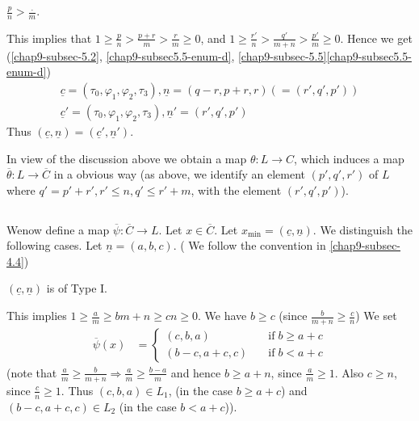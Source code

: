 \begin{case}\label{chap9-5.7-case-2}
$\frac{p}{n} > \frac{.}{m}$.

This implies that $1 \geq \frac{p}{n} > \frac{p+r}{m} > \frac{r}{m} \geq 0$, and $1 \geq \frac{r'}{n} > \frac{q'}{m+n} > \frac{p'}{m} \geq 0$. Hence we get (\ref{chap9-subsec-5.2}, \eqref{chap9-subsec5.5-enum-d}, \ref{chap9-subsec-5.5}\eqref{chap9-subsec5.5-enum-d})
\begin{gather*}
\underline{c} = (\tau_{0}, \varphi_{1}, \varphi_{2}, \tau_{3}), \underline{n} = (q-r, p+r,r)(=(r',q',p'))\\
\underline{c}' = (\tau_{0}, \varphi_{1}, \varphi_{2}, \tau_{3}), \underline{n}'= (r', q',p')
\end{gather*}
Thus $(\underline{c}, \underline{n}) = (\underline{c}', \underline{n}')$.
\end{case}

In view of the discussion above we obtain a map $\theta: L \longrightarrow C$, which induces a map $\overline{\theta} : L \longrightarrow \overline{C}$ in a obvious way (as above, we identify an element $(p',q',r')$ of $L$ where $q'=p'+r', r'\leq n, q'\leq r'+m$, with the element $(r', q', p')$).

\setcounter{subsection}{7}
\subsection{}\label{chap9-subsec-5.8}
We\pageoriginale  now define a map $\overline{\psi} : \overline{C} \longrightarrow L$. Let $x \in \overline{C}$. Let $x_{\min} = (\underline{c}, \underline{n})$. We distinguish the following cases. Let $\underline{n}= (a, b, c)$. ( We follow the convention
in \ref{chap9-subsec-4.4})

\setcounter{case}{0}
\begin{case}\label{chap9-subsec5.8-case-1}
$(\underline{c}, \underline{n})$ is of Type I.

This implies $ 1 \geq \frac{a}{m} \geq {b}{m+n} \geq{c}{n} \geq 0$. We have $b \geq c$ (since $\frac{b}{m+n} \geq \frac{c}{n}$) We set
\begin{align*}
\overline{\psi}(x) &=
\begin{cases}
(c,b,a)  \quad & \text{if} \; b \geq a + c\\
(b-c,a+c, c) \quad & \text{if} \; b < a + c
\end{cases} 
\end{align*}
(note that $\frac{a}{m} \geq \frac{b}{m+n} \Rightarrow \frac{a}{m} \geq \frac{b-a}{m}$ and hence $b \geq a + n$, since $\frac{a}{m} \geq 1$. Also $c \geq n$, since $\frac{c}{n} \geq 1$. Thus $(c, b, a)  \in L_{1}$, (in the case $b \geq a+ c$) and $(b-c, a+c, c) \in L_{2}$ (in the case $b < a+ c$)).
\end{case}

